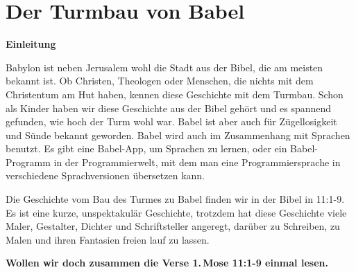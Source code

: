 \documentclass[12pt]{../../inc/mybib}
\author{Lothar Schmid}
\newenvironment{block}[1][]{%
  \vspace{1.5em}%
  \noindent\textbf{#1}\par%
  \vspace{0.0em}%
}{%
  \vspace{1em}%
}
\begin{document}
\setlength{\baselineskip}{1.5\baselineskip}

\section{Der Turmbau von Babel}
    \begin{block}[Einleitung]
    Babylon ist neben Jerusalem wohl die Stadt aus der Bibel, die am meisten bekannt ist. Ob Christen, Theologen oder Menschen, die nichts mit dem Christentum am Hut haben, kennen diese Geschichte mit dem Turmbau. Schon als Kinder haben wir diese Geschichte aus der Bibel gehört und es spannend gefunden, wie hoch der Turm wohl war. Babel ist aber auch für Zügellosigkeit und Sünde bekannt geworden. Babel wird auch im Zusammenhang mit Sprachen benutzt. Es gibt eine Babel-App, um Sprachen zu lernen, oder ein Babel-Programm in der Programmierwelt, mit dem man eine Programmiersprache in verschiedene Sprachversionen übersetzen kann.
    \end{block}
    \begin{block}
    Die Geschichte vom Bau des Turmes zu Babel finden wir in der Bibel in  {11:1-9}. Es ist eine kurze, unspektakulär Geschichte, trotzdem hat diese Geschichte viele Maler, Gestalter, Dichter und Schriftsteller angeregt, darüber zu Schreiben, zu Malen und ihren Fantasien freien lauf zu lassen. 
    \end{block}

    \textbf{Wollen wir doch zusammen die Verse 1.\,Mose 11:1-9 einmal lesen.}
    
\end{document}
